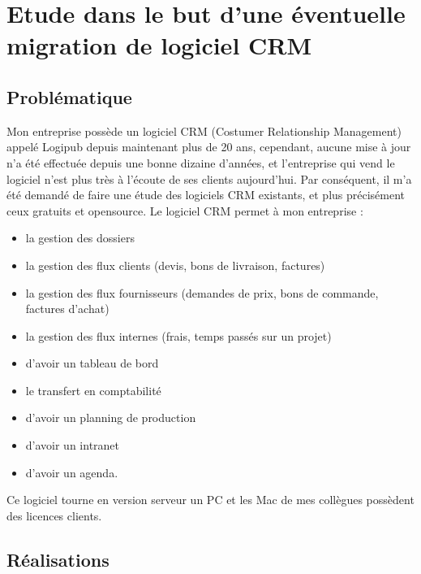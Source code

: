 \documentclass[report]{tnreport}
\begin{document}
\chapter{Etude dans le but d’une éventuelle migration de logiciel CRM}

\section{Problématique}

Mon entreprise possède un logiciel CRM (Costumer Relationship Management) appelé Logipub depuis maintenant plus de 20 ans, cependant, aucune mise à jour n’a été effectuée depuis une bonne dizaine d’années, et l’entreprise qui vend le logiciel n’est plus très à l’écoute de ses clients aujourd’hui. Par conséquent, il m’a été demandé de faire une étude des logiciels CRM existants, et plus précisément ceux gratuits et opensource. Le logiciel CRM permet à mon entreprise :
\begin{itemize}
\item la gestion des dossiers
\item la gestion des flux clients (devis, bons de livraison, factures)
\item la gestion des flux fournisseurs (demandes de prix, bons de commande, factures d’achat)
\item la gestion des flux internes (frais, temps passés sur un projet)
\item d’avoir un tableau de bord
\item le transfert en comptabilité
\item d’avoir un planning de production
\item d’avoir un intranet
\item d’avoir un agenda.
\end{itemize}
Ce logiciel tourne en version serveur un PC et les Mac de mes collègues possèdent des licences clients.


\section{Réalisations}
\end{document}
